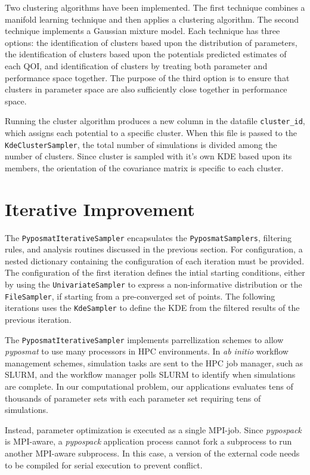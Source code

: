 Two clustering algorithms have been implemented.  The first technique combines a manifold learning technique and then applies a clustering algorithm.  The second technique implements a Gaussian mixture model.  Each technique has three options: the identification of  clusters based upon the distribution of parameters, the identification of clusters based upon the potentials predicted estimates of each QOI, and identification of clusters by treating both parameter and performance space together.  The purpose of the third option is to ensure that clusters in parameter space are also sufficiently close together in performance space.

Running the cluster algorithm produces a new column in the datafile \verb|cluster_id|, which assigns each potential to a specific cluster.  When this file is passed to the \verb|KdeClusterSampler|, the total number of simulations is divided among the number of clusters.  Since cluster is sampled with it's own KDE based upon its members, the orientation of the covariance matrix is specific to each cluster.

\section{Iterative Improvement}
	\label{sec:pypospack_iteration}

The \verb|PyposmatIterativeSampler| encapsulates the \verb|PyposmatSamplers|, filtering rules, and analysis routines discussed in the previous section.  For configuration, a nested dictionary containing the configuration of each iteration must be provided.  The configuration of the first iteration defines the intial starting conditions, either by using the \verb|UnivariateSampler| to express a non-informative distribution or the \verb|FileSampler|, if starting from a pre-converged set of points.   The following iterations uses the \verb|KdeSampler| to define the KDE from the filtered results of the previous iteration.

The \verb|PyposmatIterativeSampler| implements parrellization schemes to allow \emph{pyposmat} to use many processors in HPC environments.  In \emph{ab initio} workflow management schemes, simulation tasks are sent to the HPC job manager, such as SLURM, and the workflow manager polls SLURM to identify when simulations are complete.  In our computational problem, our applications evaluates tens of thousands of parameter sets with each parameter set requiring tens of simulations.

Instead, parameter optimization is executed as a single MPI-job.  Since \emph{pypospack} is MPI-aware, a \emph{pypospack} application process cannot fork a subprocess to run another MPI-aware subprocess.  In this case, a version of the external code needs to be compiled for serial execution to prevent conflict.

